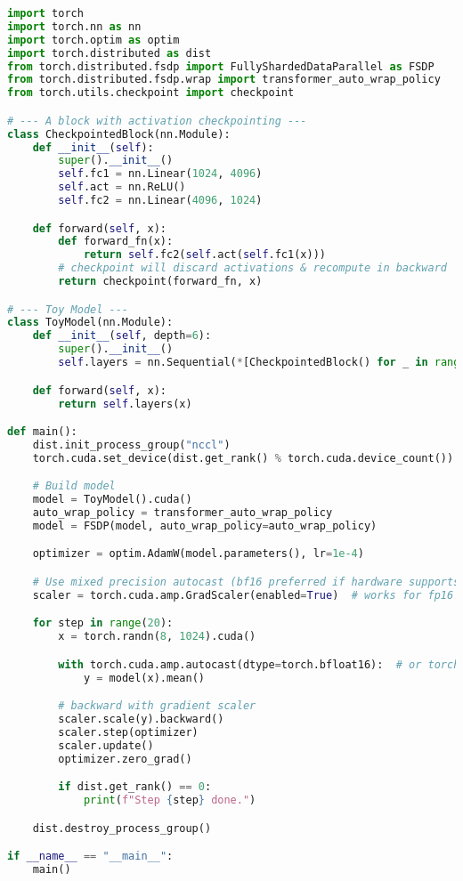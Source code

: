 \begin{lstlisting}[language=Python]
import torch
import torch.nn as nn
import torch.optim as optim
import torch.distributed as dist
from torch.distributed.fsdp import FullyShardedDataParallel as FSDP
from torch.distributed.fsdp.wrap import transformer_auto_wrap_policy
from torch.utils.checkpoint import checkpoint

# --- A block with activation checkpointing ---
class CheckpointedBlock(nn.Module):
    def __init__(self):
        super().__init__()
        self.fc1 = nn.Linear(1024, 4096)
        self.act = nn.ReLU()
        self.fc2 = nn.Linear(4096, 1024)

    def forward(self, x):
        def forward_fn(x):
            return self.fc2(self.act(self.fc1(x)))
        # checkpoint will discard activations & recompute in backward
        return checkpoint(forward_fn, x)

# --- Toy Model ---
class ToyModel(nn.Module):
    def __init__(self, depth=6):
        super().__init__()
        self.layers = nn.Sequential(*[CheckpointedBlock() for _ in range(depth)])

    def forward(self, x):
        return self.layers(x)

def main():
    dist.init_process_group("nccl")
    torch.cuda.set_device(dist.get_rank() % torch.cuda.device_count())

    # Build model
    model = ToyModel().cuda()
    auto_wrap_policy = transformer_auto_wrap_policy
    model = FSDP(model, auto_wrap_policy=auto_wrap_policy)

    optimizer = optim.AdamW(model.parameters(), lr=1e-4)

    # Use mixed precision autocast (bf16 preferred if hardware supports it)
    scaler = torch.cuda.amp.GradScaler(enabled=True)  # works for fp16

    for step in range(20):
        x = torch.randn(8, 1024).cuda()

        with torch.cuda.amp.autocast(dtype=torch.bfloat16):  # or torch.float16
            y = model(x).mean()

        # backward with gradient scaler
        scaler.scale(y).backward()
        scaler.step(optimizer)
        scaler.update()
        optimizer.zero_grad()

        if dist.get_rank() == 0:
            print(f"Step {step} done.")

    dist.destroy_process_group()

if __name__ == "__main__":
    main()
\end{lstlisting}
